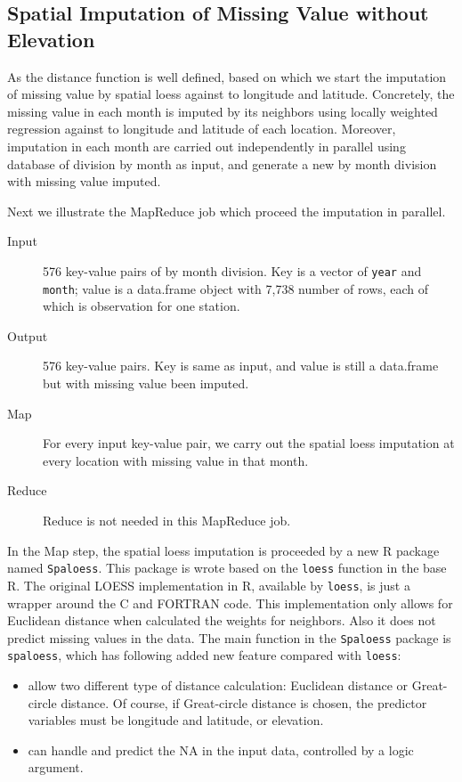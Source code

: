 \subsection{Spatial Imputation of Missing Value without Elevation}
\label{sec:impute.w/o.elev}

As the distance function is well defined, based on which we start the imputation 
of missing value by spatial loess against to longitude and latitude. Concretely,
the missing value in each month is imputed by its neighbors using locally weighted
regression against to longitude and latitude of each location. Moreover, imputation
in each month are carried out independently in parallel using database of division
by month as input, and generate a new by month division with missing value imputed.

Next we illustrate the MapReduce job which proceed the imputation in parallel.
\begin{description}
  \item[Input] 576 key-value pairs of by month division. Key is a vector of
  \texttt{year} and \texttt{month}; value is a data.frame object with 7,738 
  number of rows, each of which is observation for one station.
  \item[Output] 576 key-value pairs. Key is same as input, and value is still
  a data.frame but with missing value been imputed. 
  \item[Map]For every input key-value pair, we carry out the spatial loess 
  imputation at every location with missing value in that month. 
  \item[Reduce] Reduce is not needed in this MapReduce job.
\end{description}

In the Map step, the spatial loess imputation is proceeded by a new R package 
named \texttt{Spaloess}. This package is wrote based on the \texttt{loess} function
in the base R. The original LOESS implementation in R, available by \texttt{loess},
is just a wrapper around the C and FORTRAN code. This implementation only allows
for Euclidean distance when calculated the weights for neighbors. Also it does
not predict missing values in the data. The main function in the \texttt{Spaloess} 
package is \texttt{spaloess}, which has following added new feature compared with 
\texttt{loess}:
\begin{itemize}
  \item allow two different type of distance calculation: Euclidean distance or
  Great-circle distance. Of course, if Great-circle distance is chosen, the 
  predictor variables must be longitude and latitude, or elevation.
  \item can handle and predict the NA in the input data, controlled by a logic
  argument.
\end{itemize}

